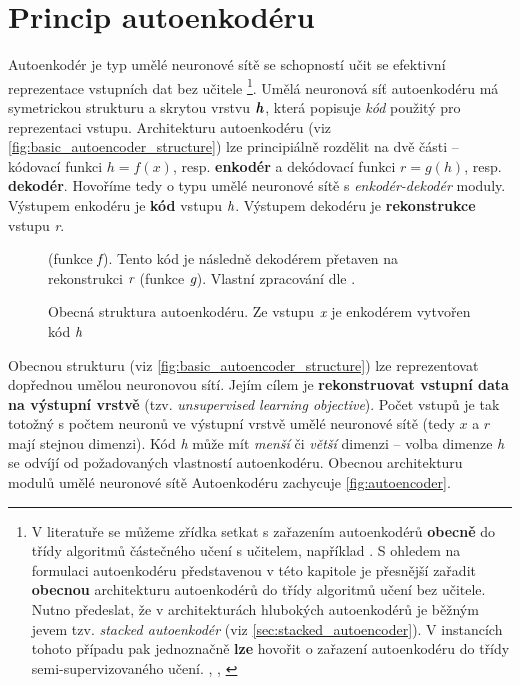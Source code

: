 \section{Princip autoenkodéru}
\label{sec:ae_princip}
Autoenkodér je typ umělé neuronové sítě se schopností učit se efektivní reprezentace vstupních dat bez učitele
\footnote{V literatuře se můžeme zřídka setkat s zařazením autoenkodérů \textbf{obecně} do třídy algoritmů částečného učení s učitelem, například \cite[str. 95]{Chollet2017}. S ohledem na formulaci autoenkodéru představenou v této kapitole je přesnější zařadit \textbf{obecnou} architekturu autoenkodérů do třídy algoritmů učení bez učitele. Nutno předeslat, že v architekturách hlubokých autoenkodérů je běžným jevem tzv. \emph{stacked autoenkodér} (viz \autoref{sec:stacked_autoencoder}). V instancích tohoto případu pak jednoznačně \textbf{lze} hovořit o zařazení autoenkodéru do třídy semi-supervizovaného učení. \cite{Bengio2006}, \cite{Ranzato2007}, \cite{Erhan2010}}.
Umělá neuronová síť autoenkodéru má symetrickou strukturu a skrytou vrstvu $\textbf{\emph{h}}$, která popisuje \emph{kód} použitý pro reprezentaci vstupu.
Architekturu autoenkodéru (viz \autoref{fig:basic_autoencoder_structure}) lze principiálně rozdělit na dvě části – kódovací funkci $h = f(x)$, resp. \textbf{enkodér}
a dekódovací funkci $r = g(h)$, resp. \textbf{dekodér}.
Hovoříme tedy o typu umělé neuronové sítě s \emph{enkodér-dekodér} moduly.
Výstupem enkodéru je \textbf{kód} vstupu $\emph{h}$. Výstupem dekodéru je \textbf{rekonstrukce} vstupu \emph{r}. \cite{Goodfellow2016}

\begin{figure}[h]
    \centering
    \caption{Obecná struktura autoenkodéru. Ze vstupu $\emph{x}$ je enkodérem vytvořen kód $\emph{h}$} (funkce $\emph{f}$). Tento kód je následně dekodérem přetaven na rekonstrukci $\emph{r}$ (funkce $\emph{g}$). Vlastní zpracování dle \textcite{Goodfellow2016}.
    \label{fig:basic_autoencoder_structure}
\end{figure}

Obecnou strukturu (viz \autoref{fig:basic_autoencoder_structure}) lze reprezentovat dopřednou umělou neuronovou sítí.
Jejím cílem je \textbf{rekonstruovat vstupní data na výstupní vrstvě} (tzv. \emph{unsupervised learning objective}). Počet vstupů je tak totožný s počtem neuronů ve výstupní vrstvě umělé neuronové sítě (tedy $x$ a $r$ mají stejnou dimenzi).
Kód \emph{h} může mít \emph{menší} či \emph{větší} dimenzi – volba dimenze \emph{h} se odvíjí od požadovaných vlastností autoenkodéru.
Obecnou architekturu modulů umělé neuronové sítě Autoenkodéru zachycuje \autoref{fig:autoencoder}. \cite{Charte2018}


